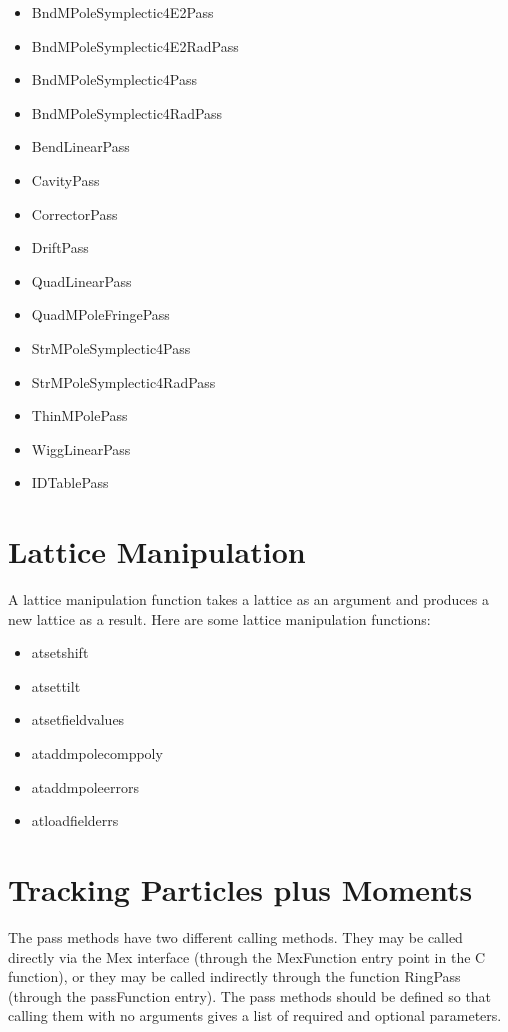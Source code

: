 \documentclass[acus]{article}
\begin{document}
\begin{itemize}
\item BndMPoleSymplectic4E2Pass
\item BndMPoleSymplectic4E2RadPass
\item BndMPoleSymplectic4Pass
\item BndMPoleSymplectic4RadPass
\item BendLinearPass
\item CavityPass
\item CorrectorPass
\item DriftPass
\item QuadLinearPass
\item QuadMPoleFringePass
\item StrMPoleSymplectic4Pass
\item StrMPoleSymplectic4RadPass
\item ThinMPolePass
\item WiggLinearPass
\item IDTablePass
\end{itemize}



\section{Lattice Manipulation}
A lattice manipulation function takes a lattice as an argument and produces a new lattice as a result.
Here are some lattice manipulation functions:
\begin{itemize}
\item atsetshift
\item atsettilt
\item atsetfieldvalues
\item ataddmpolecomppoly
\item ataddmpoleerrors
\item atloadfielderrs
\end{itemize}


\section{Tracking Particles plus Moments}
The pass methods have two different calling methods.  They may be called directly via the Mex interface (through the MexFunction entry point in the C function), or they may be called indirectly through the function RingPass (through the passFunction entry).  The pass methods should be defined so that calling them with no arguments gives a list of required and optional parameters.
\end{document}
